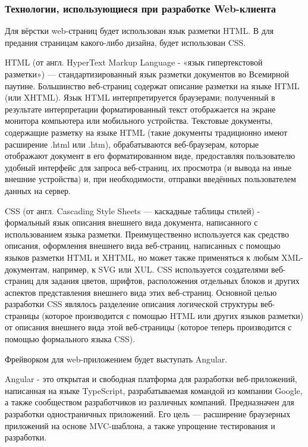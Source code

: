 
\subsubsection{Технологии, использующиеся при разработке Web-клиента}\indent

Для вёрстки web-страниц будет использован язык разметки HTML. В для предания страницам какого-либо дизайна, будет использован CSS.

HTML (от англ. HyperText Markup Language - «язык гипертекстовой разметки») — стандартизированный язык разметки документов во Всемирной паутине.
Большинство веб-страниц содержат описание разметки на языке HTML (или XHTML).
Язык HTML интерпретируется браузерами;
полученный в результате интерпретации форматированный текст отображается на экране монитора компьютера или мобильного устройства.
Текстовые документы, содержащие разметку на языке HTML (такие документы традиционно имеют расширение .html или .htm), обрабатываются веб-браузерам, которые отображают документ в его форматированном виде, предоставляя пользователю удобный интерфейс для запроса веб-страниц, их просмотра (и вывода на иные внешние устройства) и, при необходимости, отправки введённых пользователем данных на сервер.

CSS (от англ. Cascading Style Sheets — каскадные таблицы стилей) - формальный язык описания внешнего вида документа, написанного с использованием языка разметки.
Преимущественно используется как средство описания, оформления внешнего вида веб-страниц, написанных с помощью языков разметки HTML и XHTML, но может также применяться к любым XML-документам, например, к SVG или XUL. CSS используется создателями веб-страниц для задания цветов, шрифтов, расположения отдельных блоков и других аспектов представления внешнего вида этих веб-страниц. Основной целью разработки CSS являлось разделение описания логической структуры веб-страницы (которое производится с помощью HTML или других языков разметки) от описания внешнего вида этой веб-страницы (которое теперь производится с помощью формального языка CSS).

Фрейворком для web-приложением будет выступать Angular.

Angular - это открытая и свободная платформа для разработки веб-приложений, написанная на языке TypeScript, разрабатываемая командой из компании Google, а также сообществом разработчиков из различных компаний.
Предназначен для разработки одностраничных приложений.
Его цель — расширение браузерных приложений на основе MVC-шаблона, а также упрощение тестирования и разработки.


